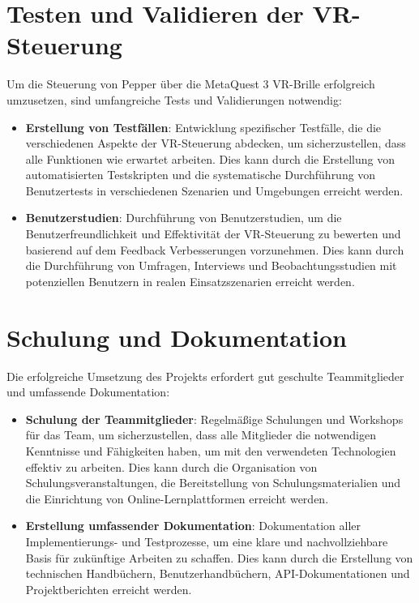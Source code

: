 \section{Testen und Validieren der VR-Steuerung}
Um die Steuerung von Pepper über die MetaQuest 3 VR-Brille erfolgreich umzusetzen, sind umfangreiche Tests und Validierungen notwendig:
\begin{itemize}
    \item \textbf{Erstellung von Testfällen}: Entwicklung spezifischer Testfälle, die die verschiedenen Aspekte der VR-Steuerung abdecken, um sicherzustellen, dass alle Funktionen wie erwartet arbeiten. Dies kann durch die Erstellung von automatisierten Testskripten und die systematische Durchführung von Benutzertests in verschiedenen Szenarien und Umgebungen erreicht werden.
    \item \textbf{Benutzerstudien}: Durchführung von Benutzerstudien, um die Benutzerfreundlichkeit und Effektivität der VR-Steuerung zu bewerten und basierend auf dem Feedback Verbesserungen vorzunehmen. Dies kann durch die Durchführung von Umfragen, Interviews und Beobachtungsstudien mit potenziellen Benutzern in realen Einsatzszenarien erreicht werden.
\end{itemize}

\section{Schulung und Dokumentation}
Die erfolgreiche Umsetzung des Projekts erfordert gut geschulte Teammitglieder und umfassende Dokumentation:
\begin{itemize}
    \item \textbf{Schulung der Teammitglieder}: Regelmäßige Schulungen und Workshops für das Team, um sicherzustellen, dass alle Mitglieder die notwendigen Kenntnisse und Fähigkeiten haben, um mit den verwendeten Technologien effektiv zu arbeiten. Dies kann durch die Organisation von Schulungsveranstaltungen, die Bereitstellung von Schulungsmaterialien und die Einrichtung von Online-Lernplattformen erreicht werden.
    \item \textbf{Erstellung umfassender Dokumentation}: Dokumentation aller Implementierungs- und Testprozesse, um eine klare und nachvollziehbare Basis für zukünftige Arbeiten zu schaffen. Dies kann durch die Erstellung von technischen Handbüchern, Benutzerhandbüchern, API-Dokumentationen und Projektberichten erreicht werden.
\end{itemize}

